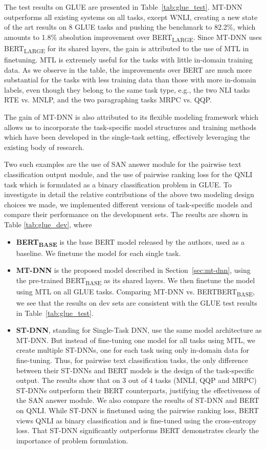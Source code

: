 The test results on GLUE are presented in Table~\ref{tab:glue_test}. MT-DNN outperforms all existing systems on all tasks, except WNLI, creating a new state of the art results on 8 GLUE tasks and pushing the benchmark to 82.2\%, which amounts to 1.8\% absolution improvement over BERT\textsubscript{LARGE}. 
Since MT-DNN uses BERT\textsubscript{LARGE} for its shared layers, the gain is attributed to the use of MTL in finetuning. 
MTL is extremely useful for the tasks with little in-domain training data. 
As we observe in the table, the improvements over BERT are much more substantial for the tasks with less training data than those with more in-domain labels, even though they belong to the same task type, e.g., the two NLI tasks RTE vs. MNLP, and the two paragraphing tasks MRPC vs. QQP. 

The gain of MT-DNN is also attributed to its flexible modeling framework which allows us to incorporate the task-specific model structures and training methods which have been developed in the single-task setting, effectively leveraging the existing body of research. 

Two such examples are the use of SAN answer module for the pairwise text classification output module, and the use of pairwise ranking loss for the QNLI task which is formulated as a binary classification problem in GLUE.
To investigate in detail the relative contributions of the above two modeling design choices we made, we implemented different versions of task-specific models and compare their performance on the development sets. The results are shown in Table \ref{tab:glue_dev}, where

\begin{itemize}
    \item \textbf{BERT\textsubscript{BASE}} is the base BERT model released by the authors, used as a baseline. We finetune the model for each single task.
    \item \textbf{MT-DNN} is the proposed model described in Section~\ref{sec:mt-dnn}, using the pre-trained BERT\textsubscript{BASE} as its shared layers. We then finetune the model using MTL on all GLUE tasks. Comparing MT-DNN vs. BERTBERT\textsubscript{BASE}, we see that the results on dev sets are consistent with the GLUE test results in Table~\ref{tab:glue_test}.
    \item \textbf{ST-DNN}, standing for Single-Task DNN, use the same model architecture as MT-DNN. But instead of fine-tuning one model for all tasks using MTL, we create multiple ST-DNNs, one for each task using only in-domain data for fine-tuning. Thus, for pairwise text classification tasks, the only difference between their ST-DNNs and BERT models is the design of the task-specific output. The results show that on 3 out of 4 tasks (MNLI, QQP and MRPC) ST-DNNs outperform their BERT counterparts, justifying the effectiveness of the SAN answer module.  We also compare the results of ST-DNN and BERT on QNLI. While ST-DNN is finetuned using the pairwise ranking loss, BERT views QNLI as binary classification and is fine-tuned using the cross-entropy loss. That ST-DNN significantly outperforms BERT demonstrates clearly the importance of problem formulation. 
\end{itemize}

